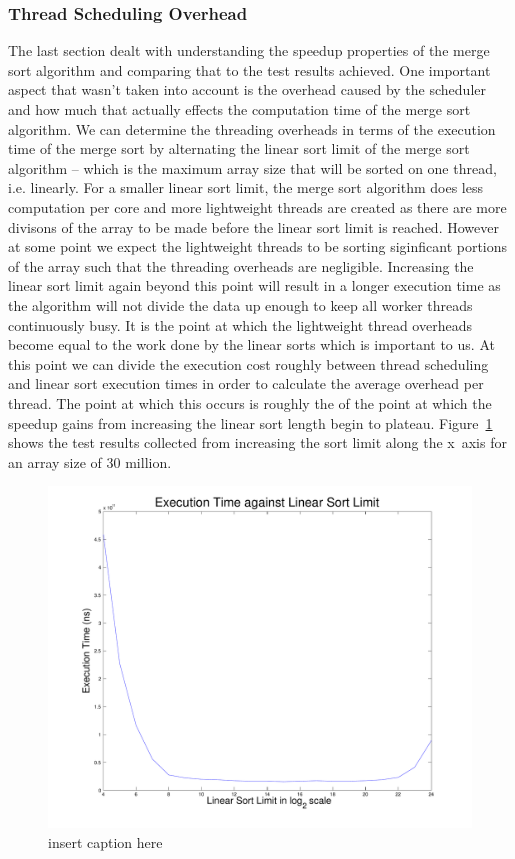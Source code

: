 \documentclass[12pt,twoside,notitlepage]{report}
\begin{document}
\subsubsection{Thread Scheduling Overhead}
The last section dealt with understanding the speedup properties of the merge sort algorithm and comparing that to the test results achieved. One important aspect that wasn't taken into account is the overhead caused by the scheduler
and how much that actually effects the computation time of the merge sort algorithm. We can determine the threading overheads in terms of the execution time of the merge sort by alternating the linear sort limit of the merge sort
algorithm -- which is the maximum array size that will be sorted on one thread, i.e. linearly. For a smaller linear sort limit, the merge sort algorithm does less computation per core and more lightweight threads are created as there
are more divisons of the array to be made before the linear sort limit is reached. However at some point we expect the lightweight threads to be sorting siginficant portions of the array such that the threading overheads are
negligible. Increasing the linear sort limit again beyond this point will result in a longer execution time as the algorithm will not divide the data up enough to keep all worker threads continuously busy. It is the point at which the
lightweight thread overheads become equal to the work done by the linear sorts which is important to us. At this point we can divide the execution cost roughly between thread scheduling and linear sort execution times in order to
calculate the average overhead per thread. The point at which this occurs is roughly the of the point at which the speedup gains from increasing the linear sort length begin to plateau. Figure~\ref{fig:sort_limit_graph} shows the test
results collected from increasing the sort limit along the x~axis for an array size of 30 million.

\begin{figure}[h!]
\includegraphics[width=\linewidth]{sort_limit_graph}
\caption{insert caption here}
\label{fig:sort_limit_graph}
\end{figure}
\end{document}
